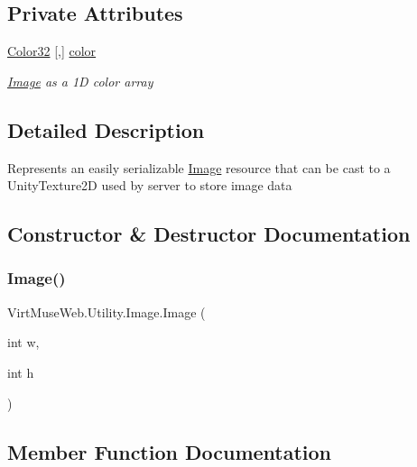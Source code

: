 \subsection*{Private Attributes}
\begin{DoxyCompactItemize}
\item 
\mbox{\hyperlink{struct_virt_muse_web_1_1_utility_1_1_image_1_1_color32}{Color32}} \mbox{[},\mbox{]} \mbox{\hyperlink{class_virt_muse_web_1_1_utility_1_1_image_a0a52ad672d00d9b10d8f66717ce4cfb2}{color}}
\begin{DoxyCompactList}\small\item\em \mbox{\hyperlink{class_virt_muse_web_1_1_utility_1_1_image}{Image}} as a 1D color array \end{DoxyCompactList}\end{DoxyCompactItemize}


\subsection{Detailed Description}
Represents an easily serializable \mbox{\hyperlink{class_virt_muse_web_1_1_utility_1_1_image}{Image}} resource that can be cast to a Unity\+Texture2D used by server to store image data 



\subsection{Constructor \& Destructor Documentation}
\mbox{\label{class_virt_muse_web_1_1_utility_1_1_image_ae05544069e19310301727b4b9edc917a}} 
\subsubsection{\texorpdfstring{Image()}{Image()}}
{\footnotesize\ttfamily Virt\+Muse\+Web.\+Utility.\+Image.\+Image (\begin{DoxyParamCaption}\item[{int}]{w,  }\item[{int}]{h }\end{DoxyParamCaption})}



\subsection{Member Function Documentation}
\mbox{\label{class_virt_muse_web_1_1_utility_1_1_image_a0c71d3c117265cce4de488f0ef1e793e}} 
